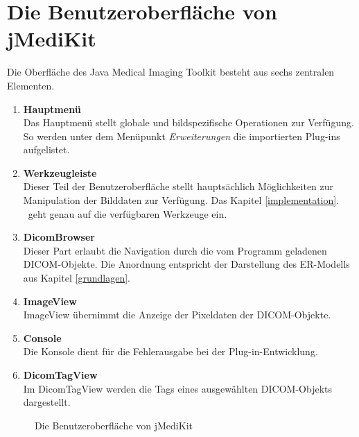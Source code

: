 \section{Die Benutzeroberfläche von jMediKit}

Die Oberfläche des Java Medical Imaging Toolkit besteht aus sechs zentralen Elementen.
\begin{enumerate}
\item \textbf{Hauptmenü} \\
	  Das Hauptmenü stellt globale und bildspezifische Operationen zur Verfügung. So werden unter dem Menüpunkt \textit{Erweiterungen} die importierten Plug-ins aufgelistet.
\item \textbf{Werkzeugleiste} \\
	  Dieser Teil der Benutzeroberfläche stellt hauptsächlich Möglichkeiten zur Manipulation der Bilddaten zur Verfügung. Das Kapitel \glqq \ref{implementation}. \grqq\ geht genau auf die verfügbaren Werkzeuge ein.
\item \textbf{DicomBrowser} \\
	  Dieser Part erlaubt die Navigation durch die vom Programm geladenen DICOM-Objekte. Die Anordnung entspricht der Darstellung des ER-Modells aus Kapitel \glqq \ref{grundlagen}. \grqq\
\item \textbf{ImageView} \\
	 ImageView übernimmt die Anzeige der Pixeldaten der DICOM-Objekte.
\item \textbf{Console} \\
	Die Konsole dient für die Fehlerausgabe bei der Plug-in-Entwicklung.
\item \textbf{DicomTagView} \\
	Im DicomTagView werden die Tags eines ausgewählten DICOM-Objekts dargestellt.
\end{enumerate}

\begin{figure}[htbp]
  \vspace{0.5cm}
  \centering
  \caption{Die Benutzeroberfläche von jMediKit}
  \label{jmedikitui}
  \vspace{0.5cm}
\end{figure}

